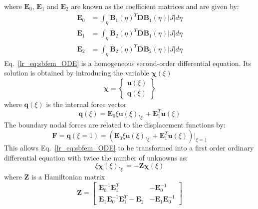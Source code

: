 %
where $\mathbf{E}_0$, $\mathbf{E}_1$ and $\mathbf{E}_2$ are known as the coefficient matrices and are given by:
\begin{equation}
    \begin{aligned}
        \mathbf{E}_0 &= \int_\eta \mathbf{B}_1(\eta)^T \mathbf{DB}_1(\eta)|J|d\eta \\
        \mathbf{E}_1 &= \int_\eta \mathbf{B}_2(\eta)^T \mathbf{DB}_1(\eta)|J|d\eta \\
        \mathbf{E}_2 &= \int_\eta \mathbf{B}_2(\eta)^T \mathbf{DB}_2(\eta)|J|d\eta
    \end{aligned}
    \label{lr_eq:sbfem_coe_matrix}
\end{equation}
%
Eq.~\ref{lr_eq:sbfem_ODE} is a homogeneous second-order differential equation.
Its solution is obtained by introducing the variable $\mathbf{\chi}(\xi)$
\begin{equation}
    \mathbf{\chi} = \left\{
        \begin{matrix}
            \mathbf{u}(\xi)  \\
            \mathbf{q}(\xi)
        \end{matrix}
    \right\}
    \label{lr_eq:sbfem_ODE_soltion}
\end{equation}
%
where $\mathbf{q}(\xi)$ is the internal force vector
\begin{equation}
    \mathbf{q}(\xi) =   \mathbf{E}_0 \xi \mathbf{u}(\xi),_{\xi} +
                        \mathbf{E}_1^T \mathbf{u}(\xi)
    \label{lr_eq:sbfem_internal_force}
\end{equation}
%
The boundary nodal forces are related to the displacement functions by:
\begin{equation}
    \mathbf{F} = \mathbf{q}(\xi=1) = (\mathbf{E}_0\xi \mathbf{u}(\xi),_{\xi} + \mathbf{E}_1^T\mathbf{u}(\xi))|_{\xi=1}
    \label{lr_eq:sbfem_boundary_nodal_force}
\end{equation}
%
This allows Eq.~\ref{lr_eq:sbfem_ODE} to be transformed into a first order ordinary differential equation with twice the number of unknowns as:
\begin{equation}
    \xi \mathbf{\chi}(\xi),_{\xi} = -\mathbf{Z} \mathbf{\chi}(\xi)
    \label{lr_eq:sbfem_1stODE}
\end{equation}
%
where $\mathbf{Z}$ is a Hamiltonian matrix
\begin{equation}
    \mathbf{Z} = \begin{bmatrix}
        \mathbf{E}_0^{-1} \mathbf{E}_1^T    &  -\mathbf{E}_0^{-1}   \\
        \mathbf{E}_1 \mathbf{E}_0^{-1} \mathbf{E}_1^T - \mathbf{E}_2    &   -\mathbf{E}_1 \mathbf{E}_0^{-1}
    \end{bmatrix}
    \label{lr_eq:sbfem_zmatrix}
\end{equation}
